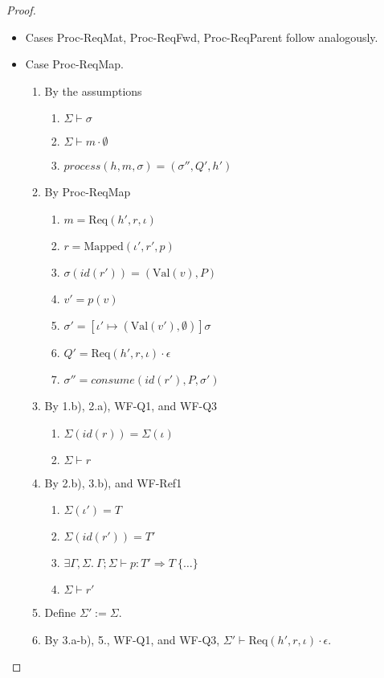 \documentclass{article}
\theoremstyle{definition}
\newcommand{\Mapped}[3]{\text{Mapped}(#1, #2, #3)}
\newcommand{\Req}[3]{\text{Req}(#1, #2, #3)}
\newcommand{\Val}[1]{\text{Val}(#1)}
\begin{document}
\begin{proof}
\begin{itemize}
\item Cases Proc-ReqMat, Proc-ReqFwd, Proc-ReqParent follow analogously.

\item Case Proc-ReqMap.
\begin{enumerate}
\item By the assumptions
  \begin{enumerate}[label=(\alph*)]
  \item $\Sigma \vdash \sigma$
  \item $\Sigma \vdash m \cdot \emptyset$
  \item $process(h, m, \sigma) = (\sigma'', Q', h')$
  \end{enumerate}
\item By Proc-ReqMap
  \begin{enumerate}[label=(\alph*)]
  \item $m = {\Req {h'} r \iota}$
  \item $r = {\Mapped {\iota'} {r'} p}$
  \item $\sigma(id(r')) = ({\Val v}, P)$
  \item $v' = p(v)$
  \item $\sigma' = [\iota' \mapsto ({\Val {v'}}, \emptyset)]\sigma$
  \item $Q' = {\Req {h'} r \iota} \cdot \epsilon$
  \item $\sigma'' = consume(id(r'), P, \sigma')$
  \end{enumerate}
\item By 1.b), 2.a), WF-Q1, and WF-Q3
  \begin{enumerate}[label=(\alph*)]
  \item $\Sigma(id(r)) = \Sigma(\iota)$
  \item $\Sigma \vdash r$
  \end{enumerate}
\item By 2.b), 3.b), and WF-Ref1
  \begin{enumerate}[label=(\alph*)]
  \item $\Sigma(\iota') = T$
  \item $\Sigma(id(r')) = T'$
  \item $\exists \Gamma, \Sigma.~\Gamma ; \Sigma \vdash p : T' \Rightarrow T~\{\ldots\}$
  \item $\Sigma \vdash r'$
  \end{enumerate}
\item Define $\Sigma' := \Sigma$.
\item By 3.a-b), 5., WF-Q1, and WF-Q3, $\Sigma' \vdash {\Req {h'} r \iota} \cdot \epsilon$.

\end{enumerate}
\end{itemize}
\end{proof}
\end{document}
